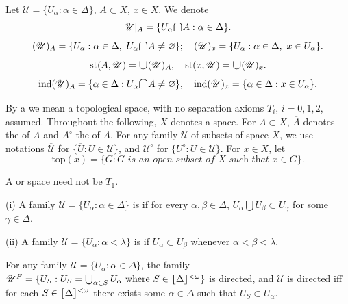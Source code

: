 \documentclass[main.tex]{subfiles}
\begin{document}
Let $\mathscr{U} = \{U_\alpha: \alpha \in \Delta\}$, $A \subset X$, $x \in X$. We denote
$$
\mathscr{U}|_A = \{U_\alpha \raisebox{-1pt}{\scalebox{1.5}{$\cap$}} A: \alpha \in \Delta\}.$$
$$
(\mathscr{U})_A = \{U_\alpha: \alpha \in \Delta, 
\ U_\alpha \raisebox{-1pt}{\scalebox{1.5}{$\cap$}} A \neq \varnothing\}; 
\quad (\mathscr{U})_x = \{U_\alpha: \alpha \in \Delta, \ x \in U_\alpha\}.$$
$$	
\text{st}(A, \mathscr{U}) = \raisebox{-1pt}{\scalebox{1.4}{$\cup$}} (\mathscr{U})_A, 
\quad \text{st}(x, \mathscr{U}) = \raisebox{-1pt}{\scalebox{1.4}{$\cup$}} (\mathscr{U})_x.$$
$$
\text{ind}(\mathscr{U})_A = \{\alpha \in \Delta: 
U_\alpha \raisebox{-1pt}{\scalebox{1.5}{$\cap$}} A \neq \varnothing\}, \quad 
\text{ind}(\mathscr{U})_x = \{\alpha \in \Delta: x \in U_\alpha\}.$$

By a   
we mean a topological space, with no separation axioms $T_i$, $i=0,1,2$, assumed.
Throughout the following, $X$ denotes a space. For $A \subset X$, $\overline{A}$ denotes the 
of $A$ and $A^\circ$ the 
of $A$. 
For any family $\mathscr{U}$ of subsets of space $X$, we use notations
$\overline{\mathscr{U}}$ for  $\{\overline{U}: U\in\mathscr{U}\}$,
and $\mathscr{U}^\circ$ for  $\{U^\circ: U\in\mathscr{U}\}$.
For $x \in X$, let
$$
\text{top}(x) = \{G: G \textit{ is an open subset of } X 
\textit{ such that } x \in G\}.$$

A  
or  
space need not be $T_1$.	

{ \label{def:1.1.1}
	\textup{(i)} A family $\mathscr{U} = \{ U_\alpha: \alpha\in \Delta\}$  is
	if for every $\alpha, \beta \in \Delta$, 
	$U_\alpha\bigcup U_\beta	\subset U_\gamma$ for some $\gamma\in\Delta$. 
	
	\textup{(ii)} A family $\mathscr{U} = \{ U_\alpha: \alpha < \lambda\}$  is
	if $U_\alpha\subset U_\beta$
	whenever $\alpha < \beta <\lambda$.
} %

\vspace{8pt}
For any family $\mathscr{U} = \{ U_\alpha: \alpha\in \Delta\}$, the family
$\mathscr{U}^F = \{U_S: U_S = \bigcup_{\alpha\in S}U_\alpha 
\text{ where } S\in\hstretch{1.8}{[}\Delta\hstretch{1.8}{]}^{<\omega}\}$ 
is directed, and 
$\mathscr{U}$ is directed iff for each $S\in \hstretch{1.8}{[}\Delta\hstretch{1.8}{]}^{<\omega}$
there exists some $\alpha\in\Delta$ such that $U_S\subset U_\alpha$.
\end{document}
